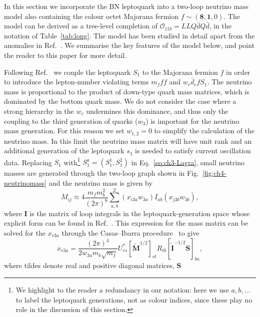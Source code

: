 In this section we incorporate the BN leptoquark into a two-loop neutrino mass
model also containing the colour octet Majorana fermion
$f \sim (\mathbf{8}, \mathbf{1}, 0)$. The model can be derived as a tree-level
completion of $\mathcal{O}_{11b} = LLQ\bar{d}Q\bar{d}$, in the notation of
Table~\ref{tab:long}. The model has been studied in detail apart from the
anomalies in Ref.~\cite{Angel:2013hla}. We summarise the key features of the
model below, and point the reader to this paper for more detail.

Following Ref.~\cite{Angel:2013hla} we couple the leptoquark $S_{1}$ to the
Majorana fermion $f$ in order to introduce the lepton-number violating terms
$m_f f f$ and $w_r \bar{d}_r f S_{1}$. The neutrino mass is proportional to the
product of down-type quark mass matrices, which is dominated by the bottom quark
mass. We do not consider the case where a strong hierarchy in the $w_r$
undermines this dominance, and thus only the coupling to the third generation of
quarks ($w_3$) is important for the neutrino mass generation. For this reason we
set $w_{1,2} = 0$ to simplify the calculation of the neutrino mass. In this
limit the neutrino mass matrix will have unit rank and an additional generation
of the leptoquark $s_{1}$ is needed to satisfy current oscillation data.
Replacing $S_{1}$ with\footnote{We highlight to the reader a redundancy in our
  notation: here we use $a, b, \ldots$ to label the leptoquark generations, not
  as colour indices, since these play no role in the discussion of this
  section.} $S_{1}^{a} = (S^{1}_1, S_1^{2})$ in Eq.~\eqref{eq:ch3-Lagra}, small
neutrino masses are generated through the two-loop graph shown in
Fig.~\ref{fig:ch4-neutrinomass} and the neutrino mass is given by
\begin{equation}
  \label{eq:ch4-massformula}
  M_{ij} \approx 4\frac{m_f
    m_b^2}{(2\pi)^8} \sum_{a, b}^2 (x_{i3a} w_{3a}) I_{ab}
  (x_{j3b} w_{3b}),
\end{equation}
where $\mathbf{I}$ is the matrix of loop integrals in the leptoquark-generation
space whose explicit form can be found in Ref.~\cite{Angel:2013hla}. This
expression for the mass matrix can be solved for the $x_{r3a}$ through the
Casas--Ibarra procedure~\cite{Casas:2001sr} to give
\begin{equation}
  \label{eq:ch4-ci}
  x_{r3a} = \frac{(2\pi)^4}{2w_{3a}m_b\sqrt{m_f}} U^*_{rs} [\tilde{\mathbf{M}}^{1/2}]_{st} R_{tb} [\tilde{\mathbf{I}}^{-1/2}\mathbf{S}]_{ba},
\end{equation}
where tildes denote real and positive diagonal matrices, $\mathbf{S}$

